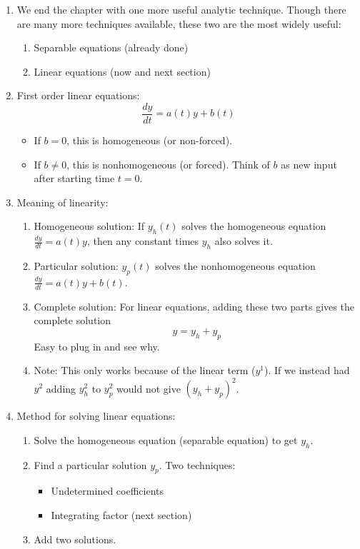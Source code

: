 \documentclass{article}
\begin{document}
\begin{enumerate}

\item We end the chapter with one more useful analytic technique. Though there are many more techniques available, these two are the most widely useful:
\begin{enumerate}
\item Separable equations (already done)
\item Linear equations (now and next section)
\end{enumerate}

\item First order linear equations:
\[
\frac{dy}{dt} = a(t)y + b(t)
\]
\begin{itemize}
\item If $b=0$, this is homogeneous (or non-forced).
\item If $b\neq 0$, this is nonhomogeneous (or forced). Think of $b$ as new input after starting time $t=0$. 
\end{itemize}

\item Meaning of linearity:
\begin{enumerate}
\item Homogeneous solution: If $y_h(t)$ solves the homogeneous equation $\frac{dy}{dt} = a(t)y$, then any constant times $y_h$ also solves it.
\item Particular solution: $y_p(t)$ solves the nonhomogeneous equation $\frac{dy}{dt} = a(t)y+b(t)$.
\item Complete solution: For linear equations, adding these two parts gives the complete solution
\[
y = y_h + y_p
\]
Easy to plug in and see why.
\item Note: This only works because of the linear term ($y^1$). If we instead had $y^2$ adding $y_h^2$ to $y_p^2$ would not give $(y_h+y_p)^2$.
\end{enumerate}

\item Method for solving linear equations:
\begin{enumerate}
\item Solve the homogeneous equation (separable equation) to get $y_h$.
\item Find a particular solution $y_p$. Two techniques:
\begin{itemize}
\item Undetermined coefficients
\item Integrating factor (next section)
\end{itemize}
\item Add two solutions.
\end{enumerate}


\end{enumerate}
\end{document}
